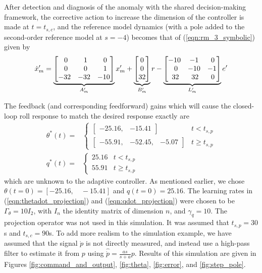 After detection and diagnosis of the anomaly with the shared decision-making framework, the corrective action to increase the dimension of the controller is made at $t = t_{s,c}$, and the reference model dynamics (with a pole added to the second-order reference model at $s = -4$) becomes that of (\ref{eqn:rm_3_symbolic}) given by
\begin{equation}
	\dot{x}_m' = \underbrace{\begin{bmatrix}
		\hfil 0 & \hfil 1 & \hfil 0\\ \hfil 0 & \hfil 0 & \hfil 1 \\ -32 & -32 & -10
	\end{bmatrix}}_{A_m'} x_m' + \underbrace{\begin{bmatrix}
		0 \\ 0 \\ 32
	\end{bmatrix}}_{B_m'} r - \underbrace{\begin{bmatrix}
		-10 & -1 & \hfil 0 \\ \hfil 0 & -10 & -1 \\ \hfil 32 & \hfil 32 & \hfil 0
	\end{bmatrix}}_{L_m'} e'
	\label{eqn:rm_3}
\end{equation}

The feedback (and corresponding feedforward) gains which will cause the closed-loop roll response to match the desired response exactly are
\begin{align}
	\theta^*(t) = & \begin{cases}
		\begin{bmatrix}
			-25.16, & -15.41
		\end{bmatrix}  & t < t_{s,p} \\
		\begin{bmatrix}
			-55.91, & -52.45, & -5.07
		\end{bmatrix} & t \geq t_{s,p}
	\end{cases} \\
	q^*(t) = & \begin{cases}
		25.16 & t < t_{s,p} \\
		55.91 & t \geq t_{s,p}
	\end{cases}
\end{align}
\noindent which are unknown to the adaptive controller. As mentioned earlier, we chose $\theta(t=0)= [-25.16, \quad -15.41]$ and $q(t=0)=25.16$. The learning rates in (\ref{eqn:thetadot_projection}) and (\ref{eqn:qdot_projection}) were chosen to be $\Gamma_\theta = 10 I_2$, with $I_n$ the identity matrix of dimension $n$, and $\gamma_q = 10$. The projection operator was not used in this simulation. It was assumed that $t_{s,p}=30$s and $t_{s,c}=90$s. To add more realism to the simulation example, we have assumed that the signal $\dot{p}$ is not directly measured, and instead use a high-pass filter to estimate it from $p$ using $\hat{\dot{p}} = \frac{as}{s+a} p$. Results of this simulation are given in Figures \ref{fig:command_and_output}, \ref{fig:theta}, \ref{fig:error}, and \ref{fig:step_pole}. 

